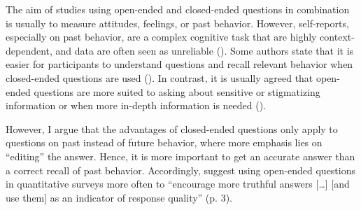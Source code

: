 \documentclass[twocolumn, serif, empirical, authordate]{jote-article}
\begin{document}
The aim of studies using open-ended and closed-ended questions in combination is usually to measure attitudes, feelings, or past behavior.
However, self-reports, especially on past behavior, are a complex cognitive task that are highly context-dependent, and data are often seen as unreliable (). Some authors state that it is easier for participants to understand questions and recall relevant behavior when closed-ended questions are used (). In contrast, it is usually agreed that open-ended questions are more suited to asking about sensitive or stigmatizing information or when more in-depth information is needed ().

However, I argue that the advantages of closed-ended questions only apply to questions on past instead of future behavior, where more emphasis lies on ``editing'' the answer. Hence, it is more important to get an accurate answer than a correct recall of past behavior.
Accordingly, \textcite{Singer2017} suggest using open-ended questions in quantitative surveys more often to ``encourage more truthful answers {[}\ldots{]} {[}and use them{]} as an indicator of response quality'' (p. 3).
\end{document}
